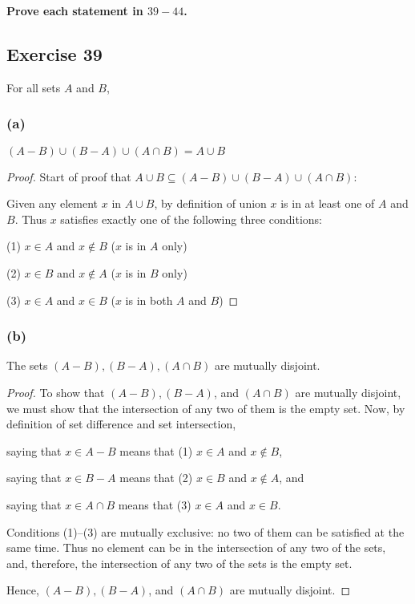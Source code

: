 \documentclass[14pt]{extarticle}
\newcommand{\cy}{\color{cyan}}
\begin{document}
{\bf \cy Prove each statement in $39-44$.}

\subsection{Exercise 39}
For all sets $A$ and $B$,

\subsubsection{(a)}
\((A - B) \cup (B - A) \cup (A \cap B) = A \cup B\)

\begin{proof}
  Start of proof that \(A \cup B \subseteq (A-B) \cup (B-A) \cup (A \cap B)\):

  Given any element $x$ in \(A \cup B\), by definition of union $x$ is in at least one of $A$ and $B$. Thus $x$
  satisfies exactly one of the following three conditions:

  (1) \(x \in A\) and \(x \notin B\) ($x$ is in $A$ only)

  (2) \(x \in B\) and \(x \notin A\) ($x$ is in $B$ only)

  (3) \(x \in A\) and \(x \in B\) ($x$ is in both $A$ and $B$)
\end{proof}

\subsubsection{(b)}
The sets \((A - B), (B - A), (A \cap B)\) are mutually disjoint.

\begin{proof}
  To show that \((A - B), (B - A)\), and \((A \cap B)\) are mutually disjoint, we must show that the intersection of
  any two of them is the empty set. Now, by definition of set difference and set intersection,

  saying that \(x \in A - B\) means that (1) \(x \in A\) and \(x \notin B\),

  saying that \(x \in B - A\) means that (2) \(x \in B\) and \(x \notin A\), and

  saying that \(x \in A \cap B\) means that (3) \(x \in A\) and \(x \in B\).

  Conditions (1)–(3) are mutually exclusive: no two of them can be satisfied at the same time. Thus no element can be
  in the intersection of any two of the sets, and, therefore, the intersection of any two of the sets is the empty set.

  Hence, \((A - B), (B - A)\), and \((A \cap B)\) are mutually disjoint.
\end{proof}
\end{document}
